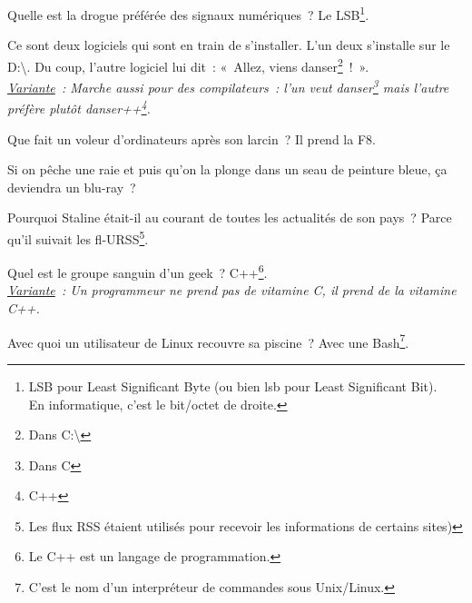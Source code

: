 \documentclass[10pt,a5paper,fullpage]{book}
\begin{document}
\begin{enumerate}
{		%
		\item Quelle est la drogue préférée des signaux numériques~? Le LSB\footnote{LSB pour Least Significant Byte (ou bien lsb pour Least Significant Bit). \\En informatique, c’est le bit/octet de droite.}.
		\item Ce sont deux logiciels qui sont en train de s’installer. L’un deux s’installe sur le D:\textbackslash. Du coup, l’autre logiciel lui dit~: « Allez, viens danser\footnote{Dans C:\textbackslash}~! ».
		\\\textit{\underline{Variante}~: Marche aussi pour des compilateurs~: l'un veut danser\footnote{Dans C} mais l'autre préfère plutôt danser++\footnote{C++}.}
		\item Que fait un voleur d’ordinateurs après son larcin~? Il prend la F8.
		\item Si on pêche une raie et puis qu’on la plonge dans un seau de peinture bleue, ça deviendra un blu-ray~?
		\item Pourquoi Staline était-il au courant de toutes les actualités de son pays~? Parce qu’il suivait les fl-URSS\footnote{Les flux RSS étaient utilisés pour recevoir les informations de certains sites)}.
		\item Quel est le groupe sanguin d’un geek~? C++\footnote{Le C++ est un langage de programmation.}.
		\\\textit{\underline{Variante}~: Un programmeur ne prend pas de vitamine C, il prend de la vitamine C++.}
		\item Avec quoi un utilisateur de Linux recouvre sa piscine~? Avec une Bash\footnote{C'est le nom d'un interpréteur de commandes sous Unix/Linux.}.
}
\end{enumerate}
\end{document}
